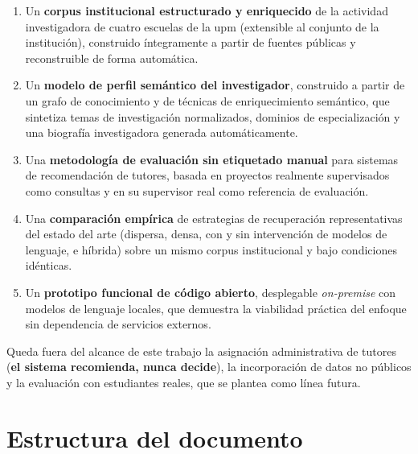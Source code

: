 \begin{enumerate}
    \item Un \textbf{corpus institucional estructurado y enriquecido} de la actividad investigadora de cuatro escuelas de la \gls{upm} (extensible al conjunto de la institución), construido íntegramente a partir de fuentes públicas y reconstruible de forma automática.
    \item Un \textbf{modelo de perfil semántico del investigador}, construido a partir de un grafo de conocimiento y de técnicas de enriquecimiento semántico, que sintetiza temas de investigación normalizados, dominios de especialización y una biografía investigadora generada automáticamente.
    \item Una \textbf{metodología de evaluación sin etiquetado manual} para sistemas de recomendación de tutores, basada en proyectos realmente supervisados como consultas y en su supervisor real como referencia de evaluación.
    \item Una \textbf{comparación empírica} de estrategias de recuperación representativas del estado del arte (dispersa, densa, con y sin intervención de modelos de lenguaje, e híbrida) sobre un mismo corpus institucional y bajo condiciones idénticas.
    \item Un \textbf{prototipo funcional de código abierto}, desplegable \emph{on-premise} con modelos de lenguaje locales, que demuestra la viabilidad práctica del enfoque sin dependencia de servicios externos.
\end{enumerate}

Queda fuera del alcance de este trabajo la asignación administrativa de tutores (\textbf{el sistema recomienda, nunca decide}), la incorporación de datos no públicos y la evaluación con estudiantes reales, que se plantea como línea futura.

\section{Estructura del documento}
\label{sec:estructura}

